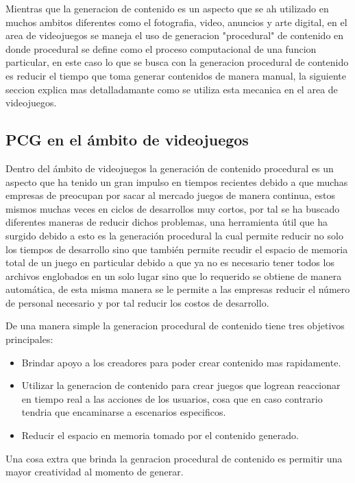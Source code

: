 Mientras que la generacion de contenido es un aspecto que se ah utilizado en
muchos ambitos diferentes como el fotografia, video, anuncios y arte digital, en
el area de videojuegos se maneja el uso de generacion "procedural" de contenido
en donde procedural se define como el proceso computacional de una funcion
particular, en este caso lo que se busca con la generacion procedural de
contenido es reducir el tiempo que toma generar contenidos de manera manual, la
siguiente seccion explica mas detalladamante como se utiliza esta mecanica en el
area de videojuegos.

\subsection{PCG en el ámbito de videojuegos}
\label{subsection:PCGInGames}

Dentro del ámbito de videojuegos la generación de contenido procedural es un
aspecto que ha tenido un gran impulso en tiempos recientes debido a que muchas
empresas de preocupan por sacar al mercado juegos de manera continua, estos
mismos muchas veces en ciclos de desarrollos muy cortos, por tal se ha buscado
diferentes maneras de reducir dichos problemas, una herramienta útil que ha
surgido debido a esto es la generación procedural la cual permite reducir no
solo los tiempos de desarrollo sino que también permite recudir el espacio de
memoria total de un juego en particular debido a que ya no es necesario tener
todos los archivos englobados en un solo lugar sino que lo requerido se obtiene
de manera automática, de esta misma manera se le permite a las empresas reducir
el número de personal necesario y por tal reducir los costos de desarrollo.

De una manera simple la generacion procedural de contenido tiene tres objetivos
principales:
\begin{itemize}
    \item Brindar apoyo a los creadores para poder crear contenido mas
    rapidamente.
    \item Utilizar la generacion de contenido para crear juegos que logrean
    reaccionar en tiempo real a las acciones de los usuarios, cosa que en caso
    contrario tendria que encaminarse a escenarios especificos.
    \item Reducir el espacio en memoria tomado por el contenido generado.
\end{itemize}
Una cosa extra que brinda la genracion procedural de contenido es permitir una
mayor creatividad al momento de generar.

